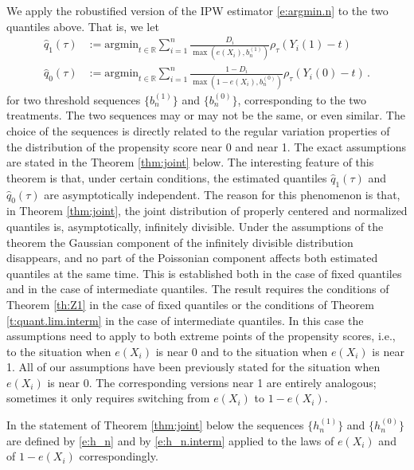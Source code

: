 \documentclass[12pt]{amsart}
\newcommand{\1}{\mathbbm{1}}
\newcommand{\0}{\mathbf{0}}
\theoremstyle{plain}
\theoremstyle{definition}
\begin{document}
We apply the robustified version of the IPW estimator \eqref{e:argmin.n} to the two quantiles above. That is, we let 
%
\begin{equation}
\label{eq:IPW_quant}
    \begin{split}
\hat{q}_1(\tau)&:=\mbox{argmin}_{t\in\mathbb{R}} \sum_{i=1}^n\frac{D_i}{ \max(e(X_i),b_n^{(1)})}\rho_\tau(Y_i(1)-t)  \\
\hat{q}_0(\tau)&:=\mbox{argmin}_{t\in\mathbb{R}} \sum_{i=1}^n\frac{1-D_i}{\max(1- e(X_i),b_n^{(0)})}\rho_\tau(Y_i(0)-t) \,.
    \end{split}
\end{equation}
%
for two threshold sequences $\{b_n^{(1)}\}$ and $\{b_n^{(0)}\}$, corresponding to the two treatments.  The two sequences may or may not be the same, or even similar. The choice of the sequences is directly related to the regular variation properties of the distribution of the propensity score near 0 and near 1. The exact assumptions are stated in the Theorem \ref{thm:joint} below. 
The interesting feature of this theorem is that, under certain conditions, the estimated quantiles $\hat{q}_1(\tau)$ and $\hat{q}_0(\tau)$ are asymptotically independent. The reason for this phenomenon is that, in Theorem \ref{thm:joint}, the joint distribution of properly centered and normalized quantiles is, asymptotically, infinitely divisible. Under the assumptions of the theorem the Gaussian component of the infinitely divisible distribution disappears, and no part of the Poissonian component affects both estimated quantiles at the same time. This is established  both in the case of fixed quantiles  and  in the case of intermediate quantiles. The result requires the conditions of
Theorem  \ref{th:Z1} in the case of fixed quantiles or the conditions of Theorem \ref{t:quant.lim.interm} in the case of intermediate quantiles. In this case the assumptions need to apply to both extreme points of the propensity scores, i.e., to the situation when $e(X_i)$ is near 0 and to the situation when $e(X_i)$ is near 1. All of our assumptions have been previously stated for the situation when $e(X_i)$ is near 0. The corresponding versions near 1 are entirely analogous; sometimes it only requires switching from $e(X_i)$ to $1-e(X_i)$.

In the statement of Theorem \ref{thm:joint} below the sequences $\{h_n^{(1)}\}$ and $\{h_n^{(0)}\}$ are defined by \eqref{e:h_n} and by \eqref{e:h_n.interm}
applied to the laws of $e(X_i)$ and of $1-e(X_i)$ correspondingly.
\end{document}
